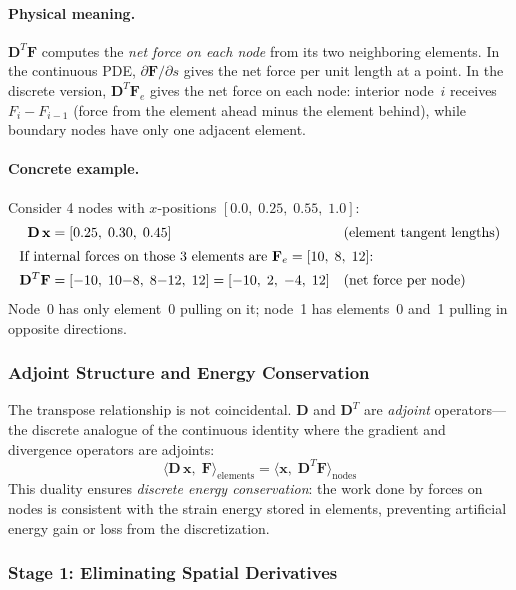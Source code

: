 \documentclass[11pt]{article}
\begin{document}
\paragraph{Physical meaning.}
$\mathbf{D}^T \mathbf{F}$ computes the \emph{net force on each node} from its two neighboring elements.
In the continuous PDE, $\partial \mathbf{F}/\partial s$ gives the net force per unit length at a point.
In the discrete version, $\mathbf{D}^T \mathbf{F}_e$ gives the net force on each node:
interior node~$i$ receives $F_i - F_{i-1}$ (force from the element ahead minus the element behind),
while boundary nodes have only one adjacent element.

\paragraph{Concrete example.}
Consider 4 nodes with $x$-positions $[0.0,\; 0.25,\; 0.55,\; 1.0]$:
\begin{align}
  \mathbf{D}\,\mathbf{x} &= [0.25,\; 0.30,\; 0.45] && \text{(element tangent lengths)} \\
  \intertext{If internal forces on those 3 elements are $\mathbf{F}_e = [10,\; 8,\; 12]$:}
  \mathbf{D}^T \mathbf{F} &= [-10,\; 10{-}8,\; 8{-}12,\; 12] = [-10,\; 2,\; -4,\; 12] && \text{(net force per node)}
\end{align}
Node~0 has only element~0 pulling on it; node~1 has elements~0 and~1 pulling in opposite directions.

\subsubsection{Adjoint Structure and Energy Conservation}

The transpose relationship is not coincidental.
$\mathbf{D}$ and $\mathbf{D}^T$ are \emph{adjoint} operators---the discrete analogue of the continuous identity where the gradient and divergence operators are adjoints:
\begin{equation}
  \langle \mathbf{D}\,\mathbf{x},\; \mathbf{F} \rangle_{\text{elements}}
  = \langle \mathbf{x},\; \mathbf{D}^T \mathbf{F} \rangle_{\text{nodes}}
  \label{eq:adjoint}
\end{equation}
This duality ensures \emph{discrete energy conservation}: the work done by forces on nodes is consistent with the strain energy stored in elements, preventing artificial energy gain or loss from the discretization.

\subsubsection{Stage 1: Eliminating Spatial Derivatives}
\end{document}
